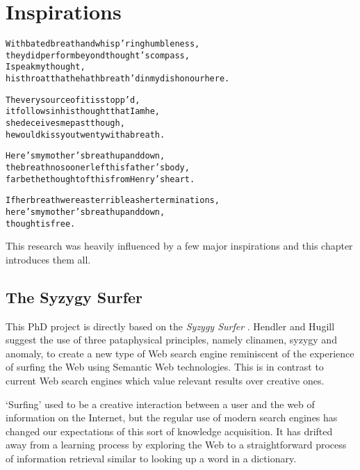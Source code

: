 
\chapter{Inspirations}
\label{ch:inspirations}

\startcontents[chapters]

\vfill

\begin{alltt}\sffamily
With bated breath and whisp'ring humbleness,
they did perform beyond thought's compass,
I speak my thought,
his throat that he hath breath'd in my dishonour here.

The very source of it is stopp'd,
it follows in his thought that I am he,
she deceives me past though,
he would kiss you twenty with a breath.  

Here's my mother's breath up and down,
the breath no sooner left his father's body,
far be the thought of this from Henry's heart.

If her breath were as terrible as her terminations,
here's my mother's breath up and down,
thought is free.
\end{alltt}

\newpage
\minicontents
\spirals

This research was heavily influenced by a few major inspirations and this chapter introduces them all.


\section{The Syzygy Surfer}
\label{s:surfer}

This PhD project is directly based on the \textit{Syzygy Surfer} \autocite{Hendler2011, Hendler2013}. Hendler and Hugill suggest the use of three pataphysical principles, namely clinamen, syzygy and anomaly, to create a new type of Web search engine reminiscent of the experience of surfing the Web using Semantic Web technologies. This is in contrast to current Web search engines which value relevant results over creative ones.

`Surfing' used to be a creative interaction between a user and the web of information on the Internet, but the regular use of modern search engines has changed our expectations of this sort of knowledge acquisition. It has drifted away from a learning process by exploring the Web to a straightforward process of information retrieval similar to looking up a word in a dictionary.

